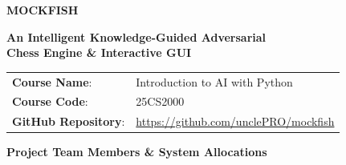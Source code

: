 \documentclass[11pt,a4paper]{article}
\begin{document}
\begin{titlepage}
    \centering
    \vspace*{1.5cm}
    
    {\Huge\bfseries\color{primaryblue} MOCKFISH \par}
    \vspace{0.4cm}
    {\LARGE\bfseries\color{darkslate} An Intelligent Knowledge-Guided Adversarial \\ Chess Engine \& Interactive GUI \par}
    \vspace{1.6cm}
    
    \begin{center}
    \colorbox{lightgraybg}{
        \begin{minipage}{0.88\textwidth}
        \vspace{0.35cm}
        \centering
        \renewcommand{\arraystretch}{1.45}
        \begin{tabular}{ll}
            \textbf{Course Name}: & Introduction to AI with Python \\
            \textbf{Course Code}: & 25CS2000 \\
            \textbf{GitHub Repository}: & \url{https://github.com/unclePRO/mockfish} \\
        \end{tabular}
        \vspace{0.35cm}
        \end{minipage}
    }
    \end{center}
    
    \vspace{1.6cm}
    
    {\large\bfseries\color{primaryblue} Project Team Members \& System Allocations \par}
    \vspace{0.4cm}
    

\end{titlepage}
\end{document}

